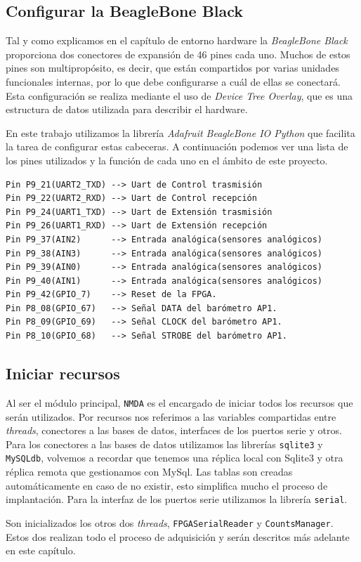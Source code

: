 	\subsection{Configurar la BeagleBone Black}
		Tal y como explicamos en el capítulo de entorno hardware la \emph{BeagleBone Black} proporciona dos conectores de expansión de 46 pines cada
		uno\cite{BeagleWikiExp}. Muchos de estos pines son multipropósito, es decir, que están compartidos por varias unidades funcionales
		internas, por lo que debe configurarse a cuál de ellas se conectará. Esta configuración se realiza mediante el uso de \emph{Device
		Tree Overlay}, que es una estructura de datos utilizada para describir el hardware.
		\par
		En este trabajo utilizamos la librería \emph{Adafruit BeagleBone IO Python}\cite{AdaFruitGit} que facilita la tarea de configurar
		estas cabeceras. A continuación podemos ver una lista de los pines utilizados y la función de cada uno en el ámbito de este proyecto.
		\begin{lstlisting}[style=myBash]
Pin P9_21(UART2_TXD) --> Uart de Control trasmisión
Pin P9_22(UART2_RXD) --> Uart de Control recepción
Pin P9_24(UART1_TXD) --> Uart de Extensión trasmisión
Pin P9_26(UART1_RXD) --> Uart de Extensión recepción
Pin P9_37(AIN2)	     --> Entrada analógica(sensores analógicos)
Pin P9_38(AIN3)	     --> Entrada analógica(sensores analógicos)
Pin P9_39(AIN0)	     --> Entrada analógica(sensores analógicos)
Pin P9_40(AIN1)	     --> Entrada analógica(sensores analógicos)
Pin P9_42(GPIO_7)    --> Reset de la FPGA.
Pin P8_08(GPIO_67)   --> Señal DATA del barómetro AP1.
Pin P8_09(GPIO_69)   --> Señal CLOCK del barómetro AP1.
Pin P8_10(GPIO_68)   --> Señal STROBE del barómetro AP1.
		\end{lstlisting}

	\subsection{Iniciar recursos}
		Al ser el módulo principal, \texttt{NMDA} es el encargado de iniciar todos los recursos que serán utilizados. Por recursos nos
		referimos a las variables compartidas entre \emph{threads}, conectores a las bases de datos, interfaces de los puertos serie y otros.
		Para los conectores a las bases de datos utilizamos las librerías \texttt{sqlite3} y \texttt{MySQLdb}, volvemos a recordar que tenemos
		una réplica local con Sqlite3 y otra réplica remota que gestionamos con MySql. Las tablas son creadas automáticamente en caso de no
		existir, esto simplifica mucho el proceso de implantación. Para la interfaz de los puertos serie utilizamos la librería
		\texttt{serial}.
		\par
		Son inicializados los otros dos \emph{threads}, \texttt{FPGASerialReader} y \texttt{CountsManager}. Estos dos realizan todo el proceso
		de adquisición y serán descritos más adelante en este capítulo. 
